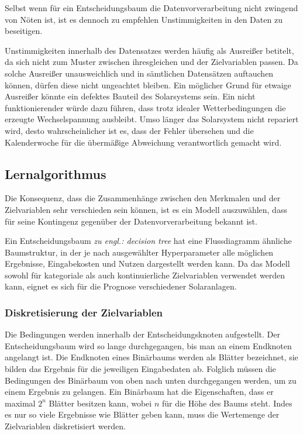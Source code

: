 \documentclass[12pt, a4paper]{article}
\begin{document}
Selbst wenn für ein Entscheidungsbaum die Datenvorverarbeitung nicht zwingend von Nöten ist, ist es dennoch zu empfehlen Unstimmigkeiten in den Daten zu beseitigen.

Unstimmigkeiten innerhalb des Datensatzes werden häufig als Ausreißer betitelt, da sich nicht zum Muster zwischen ihresgleichen und der Zielvariablen passen. Da solche Ausreißer unausweichlich und in sämtlichen Datensätzen auftauchen können, dürfen diese nicht ungeachtet bleiben. Ein möglicher Grund für etwaige Ausreißer könnte ein defektes Bauteil des Solarsystems sein. Ein nicht funktionierender würde dazu führen, dass trotz idealer Wetterbedingungen die erzeugte Wechselspannung ausbleibt. Umso länger das Solarsystem nicht repariert wird, desto wahrscheinlicher ist es, dass der Fehler übersehen und die Kalenderwoche für die übermäßige Abweichung verantwortlich gemacht wird.

\subsection{Lernalgorithmus}

Die Konsequenz, dass die Zusammenhänge zwischen den Merkmalen und der Zielvariablen sehr verschieden sein können, ist es ein Modell auszuwählen, dass für seine Kontingenz gegenüber der Datenvorverarbeitung bekannt ist. 

Ein Entscheidungsbaum \textit{zu engl.: decision tree} hat eine Flussdiagramm ähnliche Baumstruktur, in der je nach ausgewählter Hyperparameter alle möglichen Ergebnisse, Eingabekosten und Nutzen dargestellt werden kann. Da das Modell sowohl für kategoriale als auch kontinuierliche Zielvariablen verwendet werden kann, eignet es sich für die Prognose verschiedener Solaranlagen. 

\subsubsection{Diskretisierung der Zielvariablen}

Die Bedingungen werden innerhalb der Entscheidungsknoten aufgestellt. Der Entscheidungsbaum wird so lange durchgegangen, bis man an einem Endknoten angelangt ist. Die Endknoten eines Binärbaums werden als Blätter bezeichnet, sie bilden das Ergebnis für die jeweiligen Eingabedaten ab. Folglich müssen die Bedingungen des Binärbaum von oben nach unten durchgegangen werden, um zu einem Ergebnis zu gelangen. Ein Binärbaum hat die Eigenschaften, dass er maximal $2^{n}$ Blätter besitzen kann, wobei $n$ für die Höhe des Baums steht. Indes es nur so viele Ergebnisse wie Blätter geben kann, muss die Wertemenge der Zielvariablen diskretisiert werden. 
\end{document}
